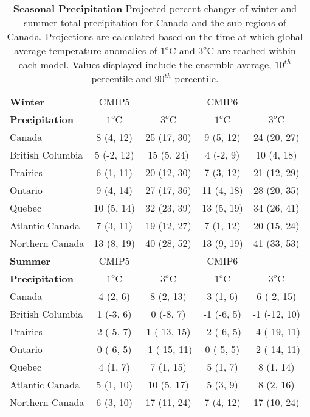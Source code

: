 \documentclass[]{scrartcl}
\begin{document}
\begin{appendices}
\begin{table}[t]
	\caption{\textbf{Seasonal Precipitation} Projected percent changes of winter and summer total precipitation for Canada and the sub-regions of Canada. Projections are calculated based on the time at which global average temperature anomalies of $1^o$C and $3^o$C are reached within each model. Values displayed include the ensemble average, $10^{th}$ percentile and $90^{th}$ percentile.}\label{table:deg_seas_pr}
	\begin{center}
		\begin{tabularx}{\linewidth}{|L|cc|cc|} 
			\hline
			\textbf{Winter} & CMIP5 &  & CMIP6 &   \\
			\textbf{Precipitation} & $1^o$C & $3^o$C & $1^o$C & $3^o$C \\
			\hline
			Canada & 8 (4, 12) & 25 (17, 30) & 9 (5, 12) & 24 (20, 27) \\ 
			British Columbia & 5 (-2, 12) & 15 (5, 24) & 4 (-2, 9) & 10 (4, 18) \\ 
			Prairies & 6 (1, 11) & 20 (12, 30) & 7 (3, 12) & 21 (12, 29) \\ 
			Ontario & 9 (4, 14) & 27 (17, 36) & 11 (4, 18) & 28 (20, 35) \\ 
			Quebec & 10 (5, 14) & 32 (23, 39) & 13 (5, 19) & 34 (26, 41) \\ 
			Atlantic Canada & 7 (3, 11) & 19 (12, 27) & 7 (1, 12) & 20 (15, 24) \\ 
			Northern Canada & 13 (8, 19) & 40 (28, 52) & 13 (9, 19) & 41 (33, 53) \\ 
			\hline
			\textbf{Summer} & CMIP5 &  & CMIP6 &   \\
			\textbf{Precipitation} & $1^o$C & $3^o$C & $1^o$C & $3^o$C \\	
			\hline
			Canada & 4 (2, 6) & 8 (2, 13) & 3 (1, 6) & 6 (-2, 15) \\ 
			British Columbia & 1 (-3, 6) & 0 (-8, 7) & -1 (-6, 5) & -1 (-12, 10) \\ 
			Prairies & 2 (-5, 7) & 1 (-13, 15) & -2 (-6, 5) & -4 (-19, 11) \\ 
			Ontario & 0 (-6, 5) & -1 (-15, 11) & 0 (-5, 5) & -2 (-14, 11) \\ 
			Quebec & 4 (1, 7) & 7 (1, 15) & 5 (1, 7) & 8 (1, 14) \\ 
			Atlantic Canada & 5 (1, 10) & 10 (5, 17) & 5 (3, 9) & 8 (2, 16) \\ 
			Northern Canada & 6 (3, 10) & 17 (11, 24) & 7 (4, 12) & 17 (10, 24) \\ 
			\hline	
		\end{tabularx}
	\end{center}
\end{table}



\end{appendices}
\end{document}

